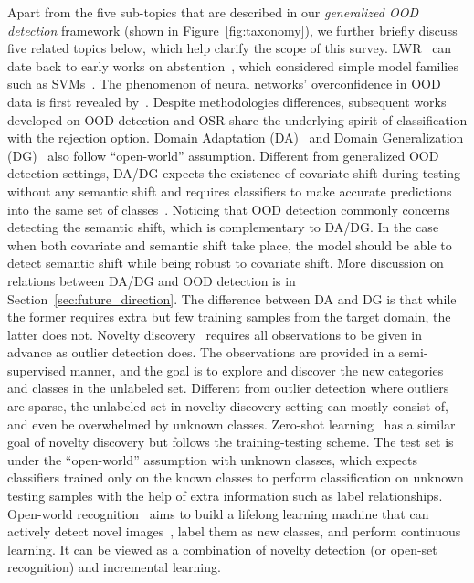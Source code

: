 \label{sec:related_topics}
Apart from the five sub-topics that are described in our \emph{generalized OOD detection} framework (shown in Figure~\ref{fig:taxonomy}), we further briefly discuss five related topics below, which help clarify the scope of this survey.
\smallskip
{}
LWR~ can date back to early works on abstention~, which considered simple model families such as SVMs~.
The phenomenon of neural networks' overconfidence in OOD data is first revealed by~. Despite methodologies differences, subsequent works developed on OOD detection and OSR share the underlying spirit of classification with the rejection option. 
\smallskip
{}
Domain Adaptation (DA)~ and Domain Generalization (DG)~ also follow ``open-world'' assumption. Different from generalized OOD detection settings, DA/DG expects the existence of covariate shift during testing without any semantic shift and requires classifiers to make accurate predictions into the same set of classes~.
Noticing that OOD detection commonly concerns detecting the semantic shift, which is complementary to DA/DG. In the case when both covariate and semantic shift take place, the model should be able to detect semantic shift while being robust to covariate shift. More discussion on relations between DA/DG and OOD detection is in Section~\ref{sec:future_direction}. 
The difference between DA and DG is that while the former requires extra but few training samples from the target domain, the latter does not.
\smallskip
{} 
Novelty discovery~ requires all observations to be given in advance as outlier detection does. The observations are provided in a semi-supervised manner, and the goal is to explore and discover the new categories and classes in the unlabeled set. Different from outlier detection where outliers are sparse, the unlabeled set in novelty discovery setting can mostly consist of, and even be overwhelmed by unknown classes.
\smallskip
{}
Zero-shot learning~ has a similar goal of novelty discovery but follows the training-testing scheme. The test set is under the ``open-world'' assumption with unknown classes, which expects classifiers trained only on the known classes to perform classification on unknown testing samples with the help of extra information such as label relationships.
\smallskip
{}
Open-world recognition~ aims to build a lifelong learning machine that can actively detect novel images~, label them as new classes, and perform continuous learning. It can be viewed as a combination of novelty detection (or open-set recognition) and incremental learning. 
